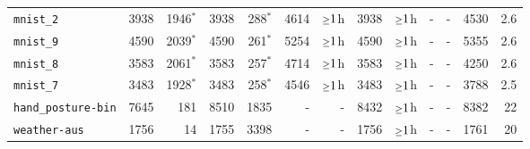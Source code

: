 \begin{tabular}{lrrrrrrrrrrrr}
\texttt{mnist\_2} & 3938 & 1946$^*$ & 3938 & 288$^*$ & 4614 & $\mathsmaller{\geq}1$h & 3938 & $\mathsmaller{\geq}1$h & - & - & 4530 & 2.6\\
\texttt{mnist\_9} & 4590 & 2039$^*$ & 4590 & 261$^*$ & 5254 & $\mathsmaller{\geq}1$h & 4590 & $\mathsmaller{\geq}1$h & - & - & 5355 & 2.6\\
\texttt{mnist\_8} & 3583 & 2061$^*$ & 3583 & 257$^*$ & 4714 & $\mathsmaller{\geq}1$h & 3583 & $\mathsmaller{\geq}1$h & - & - & 4250 & 2.6\\
\texttt{mnist\_7} & 3483 & 1928$^*$ & 3483 & 258$^*$ & 4546 & $\mathsmaller{\geq}1$h & 3483 & $\mathsmaller{\geq}1$h & - & - & 3788 & 2.5\\
\texttt{hand\_posture-bin} & 7645 & 181 & 8510 & 1835 & - & - & 8432 & $\mathsmaller{\geq}1$h & - & - & 8382 & 22\\
\texttt{weather-aus} & 1756 & 14 & 1755 & 3398 & - & - & 1756 & $\mathsmaller{\geq}1$h & - & - & 1761 & 20\\
\bottomrule
\end{tabular}
